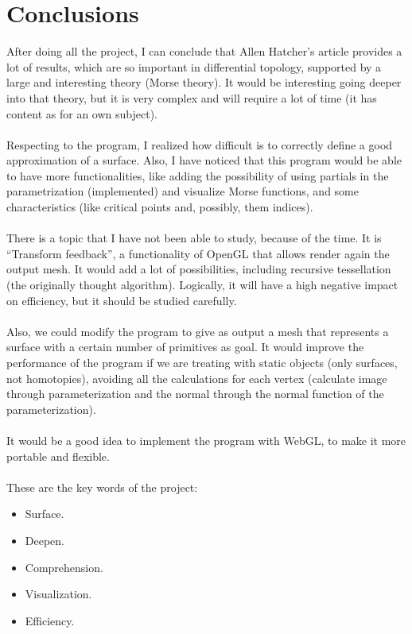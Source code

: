 \section*{Conclusions}
After doing all the project, I can conclude that Allen Hatcher's article \cite{arXiv:1312.3518} provides a lot of results, which are so important in differential topology, supported by a large and interesting theory (Morse theory). It would be interesting going deeper into that theory, but it is very complex and will require a lot of time (it has content as for an own subject).\\
\\Respecting to the program, I realized how difficult is to correctly define a good approximation of a surface. Also, I have noticed that this program would be able to have more functionalities, like adding the possibility of using partials in the parametrization (implemented) and visualize Morse functions, and some characteristics (like critical points and, possibly, them indices).\\
\\There is a topic that I have not been able to study, because of the time. It is ``Transform feedback'', a functionality of OpenGL that allows render again the output mesh. It would add a lot of possibilities, including recursive tessellation (the originally thought algorithm). Logically, it will have a high negative impact on efficiency, but it should be studied carefully.\\
\\Also, we could modify the program to give as output a mesh that represents a surface with a certain number of primitives as goal. It would improve the performance of the program if we are treating with static objects (only surfaces, not homotopies), avoiding all the calculations for each vertex (calculate image through parameterization and the normal through the normal function of the parameterization).\\
\\It would be a good idea to implement the program with WebGL, to make it more portable and flexible.\\
\\These are the key words of the project:
\begin{itemize}
	\item Surface.
	\item Deepen.
	\item Comprehension.
	\item Visualization.
	\item Efficiency.
\end{itemize}

\endinput
